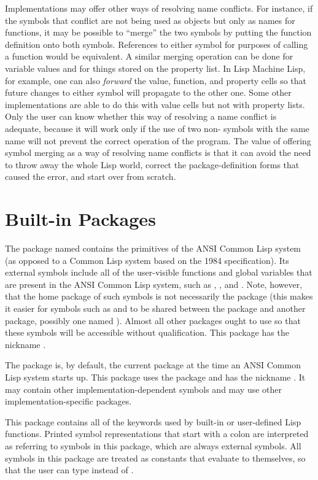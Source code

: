 Implementations may offer other ways of resolving name conflicts.
For instance, if the symbols that conflict are not being used as
objects but only as names for functions, it may be possible to ``merge''
the two symbols by putting the function definition onto both symbols.
References to either symbol for purposes of calling a function would be
equivalent.  A similar merging operation can be done for variable values
and for things stored on the property list.  In Lisp Machine Lisp, for example, one can
also \emph{forward} the value, function, and property cells so that future
changes to either symbol will propagate to the other one.  Some other
implementations are able to do this with value cells but not with
property lists.  Only the user can know whether this way of resolving
a name conflict is adequate, because it will work only if
the use of two non-
symbols with the same name will not prevent the correct operation of
the program.  The value of offering symbol merging as a way of resolving
name conflicts is that it can avoid the need to throw away the whole
Lisp world, correct the package-definition forms
that caused the error, and start over from scratch.

\section{Built-in Packages}

\begin{flushdesc}
\item[\cdf{common-lisp}]
The package named  contains the primitives of the
ANSI Common Lisp system (as opposed to a Common Lisp system based
on the 1984 specification).  Its external symbols include all of the
user-visible functions and global variables that are present in the
ANSI Common Lisp system, such as , , and .
Note, however, that the home package of such symbols is not
necessarily the  package (this makes it easier for
symbols such as  and  to be shared between
the  package and another package, possibly one named ).
Almost all other packages ought to use  so that these
symbols will be accessible without qualification.
This package has the nickname .

\item[\cdf{common-lisp-user}]
The  package is, by default,
the current package at the time an ANSI Common Lisp system starts up.
This package uses the  package
and has the nickname .
It may contain other implementation-dependent symbols
and may use other implementation-specific packages.

\item[\cdf{keyword}]
This package contains all of the keywords used by built-in
or user-defined Lisp functions.  Printed symbol representations
that start with a colon are interpreted as referring to symbols
in this package, which are always external symbols.  All symbols in this
package are treated as constants that evaluate to themselves, so that the
user can type  instead of .
\end{flushdesc}

